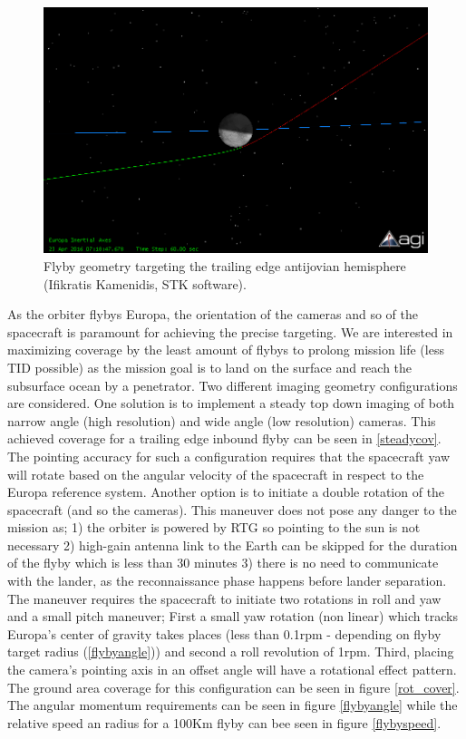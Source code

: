 \begin{figure}[htb!]
\centering
\includegraphics[width=\textwidth]{figures/Orbiter/flyby2.png}
\caption{Flyby geometry targeting the trailing edge antijovian hemisphere (Ifikratis Kamenidis, STK software).}
\label{flyby2}
\end{figure}

As the orbiter flybys Europa, the orientation of the cameras and so of the spacecraft is paramount for achieving the precise targeting. We are interested in maximizing coverage by the least amount of flybys to prolong mission life (less TID possible) as the mission goal is to land on the surface and reach the subsurface ocean by a penetrator. 
Two different imaging geometry configurations are considered. 
One solution is to implement a steady top down imaging of both narrow angle (high resolution) and wide angle (low resolution) cameras. This achieved coverage for a trailing edge inbound flyby can be seen in \ref{steadycov}. The pointing accuracy for such a configuration requires that the spacecraft yaw will rotate based on the angular velocity of the spacecraft in respect to the Europa reference system. 
Another option is to initiate a double rotation of the spacecraft (and so the cameras). This maneuver does not pose any danger to the mission as; 1) the orbiter is powered by RTG so pointing to the sun is not necessary 2) high-gain antenna link to the Earth can be skipped for the duration of the flyby which is less than 30 minutes 3) there is no need to communicate with the lander, as the reconnaissance phase happens before lander separation. The maneuver requires the spacecraft to initiate two rotations in roll and yaw and a small pitch maneuver; First a small yaw rotation (non linear) which tracks Europa's center of gravity takes places (less than 0.1rpm - depending on flyby target radius (\ref{flybyangle})) and second a roll revolution of 1rpm. Third, placing the camera's pointing axis in an offset angle will have a rotational effect pattern. The ground area coverage for this configuration can be seen in figure \ref{rot_cover}. The angular momentum requirements can be seen in figure \ref{flybyangle} while the relative speed an radius for a 100Km flyby can bee seen in figure \ref{flybyspeed}.

